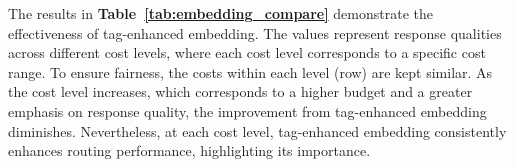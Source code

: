 


\begin{table}[htbp]
\centering
\caption{Effect of Tag-Enhanced Embedding}
\label{tab:embedding_compare}
\end{table}


The results in \textbf{Table~\ref{tab:embedding_compare}} demonstrate the effectiveness of tag-enhanced embedding.
The values represent response qualities across different cost levels, where each cost level corresponds to a specific cost range. 
To ensure fairness, the costs within each level (row) are kept similar.
As the cost level increases, which corresponds to a higher budget and a greater emphasis on response quality, the improvement from tag-enhanced embedding diminishes. 
Nevertheless, at each cost level, tag-enhanced embedding consistently enhances routing performance, highlighting its importance.

